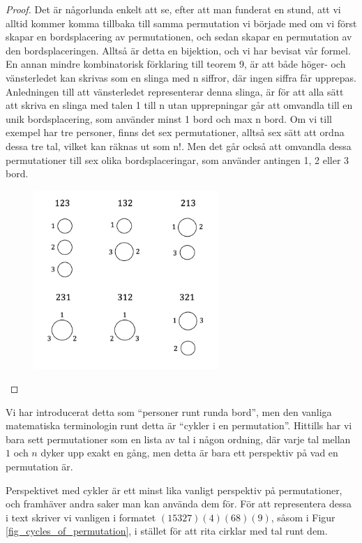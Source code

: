 \documentclass[nobib]{tufte-handout}
\begin{document}
\begin{theorem}
\begin{proof}
    Det är någorlunda enkelt att se, efter att man funderat en stund, att vi alltid kommer komma tillbaka till samma permutation vi började med om vi först skapar en bordsplacering av permutationen, och sedan skapar en permutation av den bordsplaceringen. Alltså är detta en bijektion, och vi har bevisat vår formel.
\\ \bigskip
    En annan mindre kombinatorisk förklaring till teorem 9, är att både höger- och vänsterledet kan skrivas som en slinga med n siffror, där ingen siffra får upprepas. Anledningen till att vänsterledet representerar denna slinga, är för att alla sätt att skriva en slinga med talen 1 till n utan upprepningar går att omvandla till en unik bordsplacering, som använder minst 1 bord och max n bord. Om vi till exempel har tre personer, finns det sex permutationer, alltså sex sätt att ordna dessa tre tal, vilket kan räknas ut som n!. Men det går också att omvandla dessa permutationer till sex olika bordsplaceringar, som använder antingen 1, 2 eller 3 bord.
    \begin{figure}[h]
\includegraphics[width=70mm]{bordsplac.png}
\end{figure}

  \end{proof}
\end{theorem}

\begin{remark}
  Vi har introducerat detta som ``personer runt runda bord'', men den vanliga matematiska terminologin runt detta är ``cykler i en permutation''. Hittills har vi bara sett permutationer som en lista av tal i någon ordning, där varje tal mellan $1$ och $n$ dyker upp exakt en gång, men detta är bara ett perspektiv på vad en permutation är.

  Perspektivet med cykler är ett minst lika vanligt perspektiv på permutationer, och framhäver andra saker man kan använda dem för. För att representera dessa i text skriver vi vanligen i formatet $(15327)(4)(68)(9)$, såsom i Figur \ref{fig_cycles_of_permutation}, i stället för att rita cirklar med tal runt dem.
\end{remark}
\end{document}
